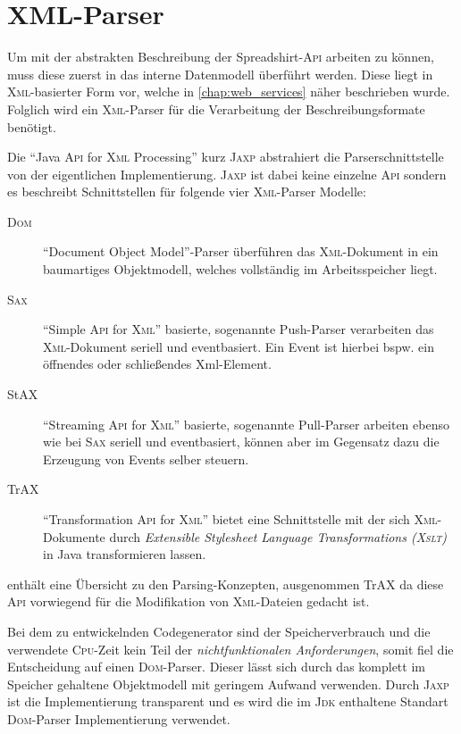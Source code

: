 \section{XML-Parser}
\label{sec:xml_parser}

Um mit der abstrakten Beschreibung der Spreadshirt-\textsc{Api} arbeiten zu können, muss diese zuerst in das interne Datenmodell überführt werden. Diese liegt in \textsc{Xml}-basierter Form vor, welche in \cref{chap:web_services} näher beschrieben wurde. Folglich wird ein \textsc{Xml}-Parser für die Verarbeitung der Beschreibungsformate benötigt.  

Die \enquote{Java \textsc{Api} for \textsc{Xml} Processing} kurz \textsc{Jaxp} abstrahiert die Parserschnittstelle von der eigentlichen Implementierung. \textsc{Jaxp} ist dabei keine einzelne \textsc{Api} sondern es beschreibt Schnittstellen für folgende vier \textsc{Xml}-Parser Modelle:

\begin{description}
    \item[\textsc{Dom}] \enquote{Document Object Model}-Parser überführen das \textsc{Xml}-Dokument in ein baumartiges Objektmodell, welches vollständig im Arbeitsspeicher liegt.
    \item[\textsc{Sax}] \enquote{Simple \textsc{Api} for \textsc{Xml}} basierte, sogenannte Push-Parser verarbeiten das \textsc{Xml}-Dokument seriell und eventbasiert. Ein Event ist hierbei bspw. ein öffnendes oder schließendes Xml-Element.
    \item[StAX] \enquote{Streaming \textsc{Api} for \textsc{Xml}} basierte, sogenannte Pull-Parser arbeiten ebenso wie bei \textsc{Sax} seriell und eventbasiert, können aber im Gegensatz dazu die Erzeugung von Events selber steuern. 
    \item[TrAX] \enquote{Transformation \textsc{Api} for \textsc{Xml}} bietet eine Schnittstelle mit der sich \textsc{Xml}-Dokumente durch \emph{Extensible Stylesheet Language Transformations (\textsc{Xslt})} in Java transformieren lassen.
\end{description}

 enthält eine Übersicht zu den Parsing-Konzepten, ausgenommen TrAX da diese \textsc{Api} vorwiegend für die Modifikation von \textsc{Xml}-Dateien gedacht ist.

Bei dem zu entwickelnden Codegenerator sind der Speicherverbrauch und die verwendete \textsc{Cpu}-Zeit kein Teil der \emph{nichtfunktionalen Anforderungen}, somit fiel die Entscheidung auf einen \textsc{Dom}-Parser. Dieser lässt sich durch das komplett im Speicher gehaltene Objektmodell mit geringem Aufwand verwenden. Durch \textsc{Jaxp} ist die Implementierung transparent und es wird die im \textsc{Jdk} enthaltene Standart \textsc{Dom}-Parser Implementierung verwendet.

